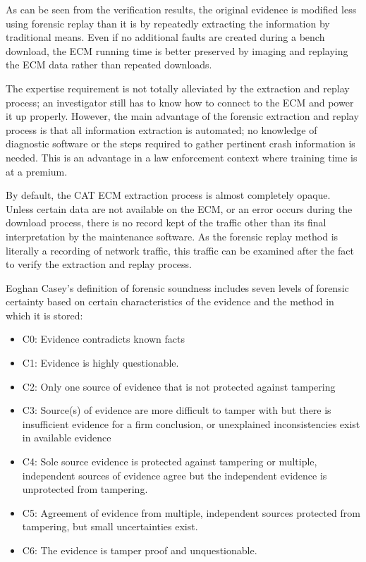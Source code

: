 As can be seen from the verification results, the original evidence is modified less using forensic replay than it is by repeatedly
extracting the information by traditional means. Even if no additional faults are created during a bench download, the ECM running
time is better preserved by imaging and replaying the ECM data rather than repeated downloads.

The expertise requirement is not totally alleviated by the extraction and replay process; an investigator still has to know how to 
connect to the ECM and power it up properly. However, the main advantage of the forensic extraction and replay process is that
all information extraction is automated; no knowledge of diagnostic software or the steps required to gather pertinent crash information
is needed. This is an advantage in a law enforcement context where training time is at a premium.

By default, the CAT ECM extraction process is almost completely opaque. Unless certain data are not available on the ECM, or an error
occurs during the download process, there is no record kept of the traffic other than its final interpretation by the maintenance
software. As the forensic replay method is literally a recording of network traffic, this traffic can be examined after the fact
to verify the extraction and replay process.

Eoghan Casey's definition of forensic soundness includes seven levels of forensic certainty based on certain characteristics
of the evidence and the method in which it is stored:

\begin{itemize}
\item C0: Evidence contradicts known facts
\item C1: Evidence is highly questionable.
\item C2: Only one source of evidence that is not protected against tampering
\item C3: Source(s) of evidence are more difficult to tamper with but there is insufficient evidence for a firm conclusion, or unexplained inconsistencies exist in available evidence
\item C4: Sole source evidence is protected against tampering or multiple, independent sources of evidence agree but the independent evidence is unprotected from tampering.
\item C5: Agreement of evidence from multiple, independent sources protected from tampering, but small uncertainties exist.
\item C6: The evidence is tamper proof and unquestionable.
\end{itemize}

